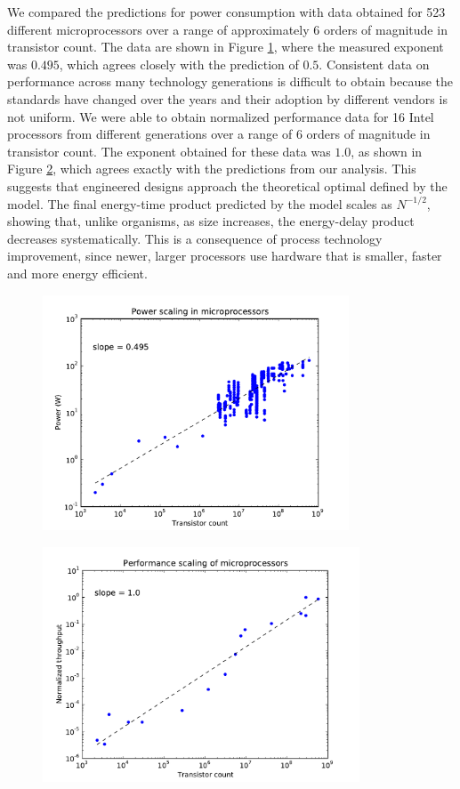 \documentclass[12pt]{article}
\begin{document}
We compared the predictions for power consumption with data obtained 
for 523 different microprocessors over a range of approximately 6 
orders of magnitude in transistor count.  The data are shown in Figure 
\ref{fig:power}, where the measured exponent was $0.495$, which agrees 
closely with the prediction of $0.5$. Consistent data on performance 
across many technology generations is difficult to obtain because the 
standards have changed over the years and their adoption by different 
vendors is not uniform.  We were able to obtain normalized performance 
data for 16 Intel processors from different generations over a range 
of 6 orders of magnitude in transistor count.  The exponent obtained 
for these data was $1.0$, as shown in Figure \ref{fig:throughput}, 
which agrees exactly with the predictions from our analysis. This 
suggests that engineered designs approach the theoretical optimal 
defined by the model.  The final energy-time product predicted by the 
model scales as $N^{-1/2}$, showing that, unlike organisms, as size 
increases, the energy-delay product decreases systematically. This is 
a consequence of process technology improvement, since newer, larger 
processors use hardware that is smaller, faster and more energy efficient.


\begin{figure}[!h]
\centering
\includegraphics[height=70mm]{Figures/power_scaling.pdf}
\caption{ }
\label{fig:power}
\end{figure}

\begin{figure}[!h]
\centering
\includegraphics[height=70mm]{Figures/throughput_scaling.pdf}
\caption{ }
\label{fig:throughput}
\end{figure}
\end{document}
